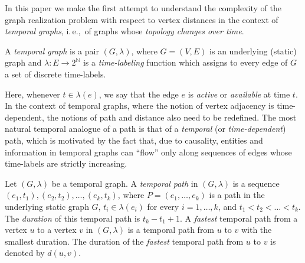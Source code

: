\documentclass[a4paper,UKenglish,cleveref, autoref, thm-restate]{lipics-v2021}
\newcommand{\ie}{i.\,e.,\ }
\begin{document}
In this paper we make the first attempt to understand the complexity of the graph realization problem with respect to vertex distances in the context of \emph{temporal graphs}, \ie of graphs whose \emph{topology changes over time}. 

\begin{definition}
\label{temp-graph-def} A \emph{temporal graph} is a pair $(G,\lambda)$,
where $G=(V,E)$ is an underlying (static) graph and $\lambda :E\rightarrow 2^\mathbb{N}$ is a \emph{time-labeling} function which assigns to every edge of $G$ a set of discrete time-labels.
\end{definition}

Here, whenever $t \in \lambda(e)$, we say that the edge $e$ is \emph{active} or \emph{available} at time $t$. In the context of temporal graphs, where the notion of vertex adjacency is time-dependent, the notions of path and distance also need to be redefined. The most natural temporal analogue of a path is that of a \emph{temporal} (or \emph{time-dependent}) path, which is motivated by the fact that, due to
causality, entities and information in temporal graphs can ``flow'' only along sequences of
edges whose time-labels are strictly increasing.

\begin{definition} \label{def:temporalPath+Duration}
Let $(G,\lambda)$ be a temporal graph. A \emph{temporal path} 
in $(G,\lambda)$ is a sequence $(e_1,t_1),(e_2,t_2),\ldots,(e_k,t_k)$, 
where $P=(e_1,\ldots,e_k)$ is a path in the underlying static graph $G$, 
$t_i\in \lambda(e_i)$ for every $i=1,\ldots,k$, and $t_1<t_2<\ldots<t_k$. 
The \emph{duration} of this temporal path %
is $t_k - t_1 + 1$.
A \emph{fastest} temporal path from a vertex $u$ to a vertex $v$ in $(G,\lambda)$ is a temporal path from $u$ to $v$ with the smallest duration.
The duration of the \emph{fastest} temporal path from $u$ to $v$ is denoted by $d(u,v)$.
\end{definition}

\end{document}
